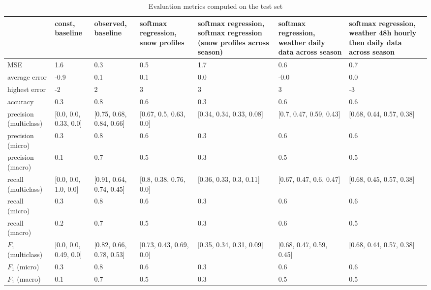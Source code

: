 \begin{table}[H]
\caption{Evaluation metrics computed on the test set}
\label{tbl:sais_eval_test}
\begin{tabular}{lllllll}
\toprule
 & const, baseline & observed, baseline & softmax regression, snow profiles & softmax regression, softmax regression (snow profiles across season) & softmax regression, weather daily data across season & softmax regression, weather 48h hourly then daily data across season \\
\midrule
MSE & 1.6 & 0.3 & 0.5 & 1.7 & 0.6 & 0.7 \\
average error & -0.9 & 0.1 & 0.1 & 0.0 & -0.0 & 0.0 \\
highest error & -2 & 2 & 3 & 3 & 3 & -3 \\
accuracy & 0.3 & 0.8 & 0.6 & 0.3 & 0.6 & 0.6 \\
precision (multiclass) & [0.0, 0.0, 0.33, 0.0] & [0.75, 0.68, 0.84, 0.66] & [0.67, 0.5, 0.63, 0.0] & [0.34, 0.34, 0.33, 0.08] & [0.7, 0.47, 0.59, 0.43] & [0.68, 0.44, 0.57, 0.38] \\
precision (micro) & 0.3 & 0.8 & 0.6 & 0.3 & 0.6 & 0.6 \\
precision (macro) & 0.1 & 0.7 & 0.5 & 0.3 & 0.5 & 0.5 \\
recall (multiclass) & [0.0, 0.0, 1.0, 0.0] & [0.91, 0.64, 0.74, 0.45] & [0.8, 0.38, 0.76, 0.0] & [0.36, 0.33, 0.3, 0.11] & [0.67, 0.47, 0.6, 0.47] & [0.68, 0.45, 0.57, 0.38] \\
recall (micro) & 0.3 & 0.8 & 0.6 & 0.3 & 0.6 & 0.6 \\
recall (macro) & 0.2 & 0.7 & 0.5 & 0.3 & 0.6 & 0.5 \\
$F_1$ (multiclass) & [0.0, 0.0, 0.49, 0.0] & [0.82, 0.66, 0.78, 0.53] & [0.73, 0.43, 0.69, 0.0] & [0.35, 0.34, 0.31, 0.09] & [0.68, 0.47, 0.59, 0.45] & [0.68, 0.44, 0.57, 0.38] \\
$F_1$ (micro) & 0.3 & 0.8 & 0.6 & 0.3 & 0.6 & 0.6 \\
$F_1$ (macro) & 0.1 & 0.7 & 0.5 & 0.3 & 0.5 & 0.5 \\
\bottomrule
\end{tabular}
\end{table}
